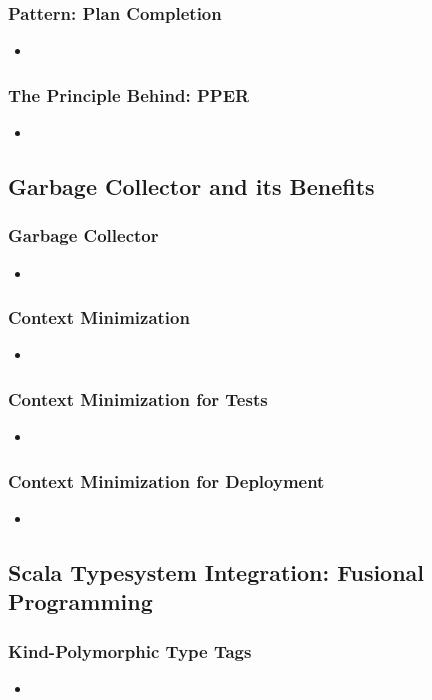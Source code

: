 \documentclass[usenames,dvipsnames]{beamer}
\begin{document}
\begin{frame}
\frametitle{Pattern: Plan Completion}
\begin{itemize}
\item 
\end{itemize}
\end{frame}

\begin{frame}
\frametitle{The Principle Behind: PPER}
\begin{itemize}
\item 
\end{itemize}
\end{frame}

\subsection{Garbage Collector and its Benefits}

\begin{frame}
\frametitle{Garbage Collector}
\begin{itemize}
\item 
\end{itemize}
\end{frame}

\begin{frame}
\frametitle{Context Minimization}
\begin{itemize}
\item 
\end{itemize}
\end{frame}

\begin{frame}
\frametitle{Context Minimization for Tests}
\begin{itemize}
\item 
\end{itemize}
\end{frame}

\begin{frame}
\frametitle{Context Minimization for Deployment}
\begin{itemize}
\item 
\end{itemize}
\end{frame}

\subsection{Scala Typesystem Integration: Fusional Programming}

\begin{frame}
\frametitle{Kind-Polymorphic Type Tags}
\begin{itemize}
\item 
\end{itemize}
\end{frame}
\end{document}
